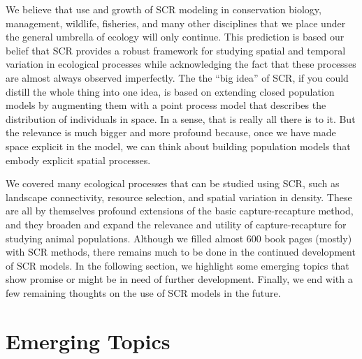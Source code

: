 We believe that use and growth of SCR modeling in conservation biology,
management, wildlife, fisheries, and many other disciplines that we place under
the general umbrella of ecology will only continue.
This prediction is based our belief that SCR provides a robust
framework for
studying spatial and temporal variation in ecological processes while acknowledging the fact
that these processes are almost always
observed imperfectly.
The the ``big idea'' of SCR,
if you could distill the whole thing into one idea, is based on
extending closed population models by augmenting them with a point
process model that describes the distribution of individuals
\citep{efford:2004} in space.
In a sense, that is
really all there is to it. But the relevance is much bigger and more
profound because, once we have made space explicit in the model,
we can think about building population models that embody explicit
spatial processes.

We covered many ecological processes that can be studied using SCR,
such as landscape connectivity, resource
selection, and spatial variation in density. These are all by
themselves profound extensions of the basic capture-recapture method,
and they broaden and expand the relevance and utility of
capture-recapture for studying animal populations.
Although we filled almost 600 book pages (mostly) with SCR methods,
there remains much to be done in the continued development of SCR
models. In the following section, we highlight some emerging topics that show promise or might be in
need of further development. Finally, we end with a few remaining
thoughts on the use of SCR models in the future.



\section{Emerging Topics}

